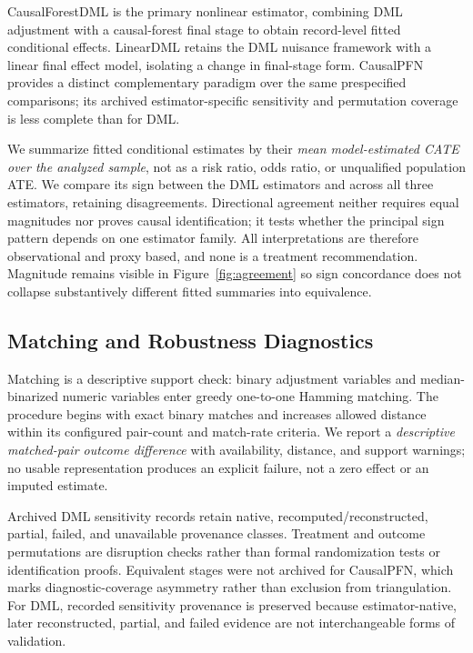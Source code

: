 \documentclass[letterpaper]{article}
\begin{document}
CausalForestDML is the primary nonlinear estimator, combining DML adjustment
with a causal-forest final stage \cite{chernozhukov2018dml,wager2018causalforest,
athey2019grf,oprescu_et_al_2019_econml} to obtain record-level fitted conditional
effects. LinearDML retains the DML nuisance framework with a linear final effect
model, isolating a change in final-stage form. CausalPFN
\cite{balazadeh2025causalpfn} provides a distinct complementary paradigm over
the same prespecified comparisons; its archived estimator-specific sensitivity
and permutation coverage is less complete than for DML.

We summarize fitted conditional estimates by their \emph{mean model-estimated
CATE over the analyzed sample}, not as a risk ratio, odds ratio, or unqualified
population ATE. We compare its sign between the DML estimators and across all
three estimators, retaining disagreements. Directional agreement neither
requires equal magnitudes nor proves causal identification; it tests whether the
principal sign pattern depends on one estimator family. All interpretations are
therefore observational and proxy based, and none is a treatment recommendation.
Magnitude remains visible in Figure~\ref{fig:agreement} so sign concordance does
not collapse substantively different fitted summaries into equivalence.

\subsection{Matching and Robustness Diagnostics}

Matching is a descriptive support check: binary adjustment variables and
median-binarized numeric variables enter greedy one-to-one Hamming matching.
The procedure begins with exact binary matches and increases allowed distance
within its configured pair-count and match-rate criteria. We report a
\emph{descriptive matched-pair outcome difference} with availability, distance,
and support warnings; no usable representation produces an explicit failure,
not a zero effect or an imputed estimate.

Archived DML sensitivity records retain native, recomputed/reconstructed,
partial, failed, and unavailable provenance classes. Treatment and outcome
permutations are disruption checks rather than formal randomization tests or
identification proofs. Equivalent stages were not archived for CausalPFN, which
marks diagnostic-coverage asymmetry rather than exclusion from triangulation.
For DML, recorded sensitivity provenance is preserved because estimator-native,
later reconstructed, partial, and failed evidence are not interchangeable forms
of validation.
\end{document}
